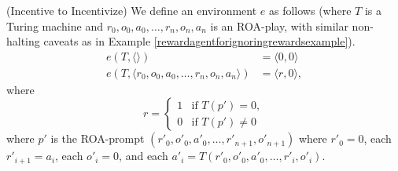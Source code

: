 \documentclass[runningheads]{llncs}
\begin{document}
\begin{example}
\label{incentivetoincentivizeexample}
    (Incentive to Incentivize)
    We define an environment $e$ as follows
    (where $T$ is a Turing machine and $r_0,o_0,a_0,\ldots,r_n,o_n,a_n$
    is an ROA-play,
    with similar non-halting caveats as in
    Example \ref{rewardagentforignoringrewardsexample}).
    \begin{align*}
        e(T,\langle\rangle) &= \langle 0, 0\rangle\\
        e(T,\langle r_0,o_0,a_0,\ldots,r_n,o_n,a_n\rangle) &= \langle r, 0\rangle,
    \end{align*}
    where
    \[
        r =
        \begin{cases}
            1 & \mbox{if $T(p')=0$},\\
            0 & \mbox{if $T(p')\not=0$}
        \end{cases}
    \]
    where $p'$ is the ROA-prompt $(r'_0,o'_0,a'_0,\ldots,r'_{n+1},o'_{n+1})$
    where $r'_0=0$, each $r'_{i+1}=a_i$,
    each $o'_i=0$, and each
    $a'_i=T(r'_0,o'_0,a'_0,\ldots,r'_i,o'_i)$.
\end{example}
\end{document}
